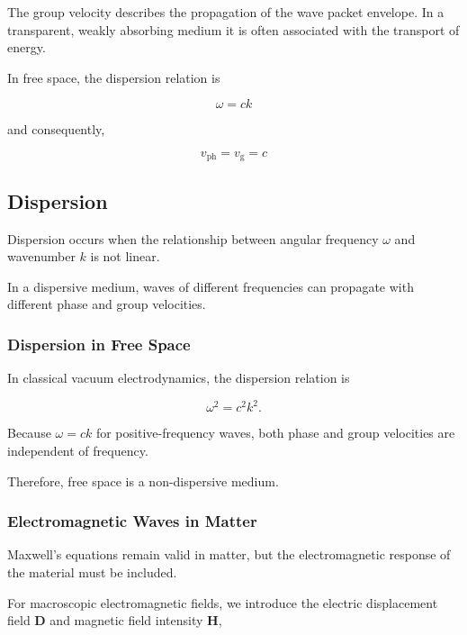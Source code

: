 The group velocity describes the propagation
of the wave packet envelope. In a transparent,
weakly absorbing medium it is often associated
with the transport of energy.


In free space, the dispersion relation is

\begin{equation}
\boxed{\omega = ck}
\label{eq:vacuum_dispersion_relation}
\end{equation}

and consequently,

\begin{equation}
\boxed{
v_{\mathrm{ph}} = v_{\mathrm{g}} = c
}
\label{eq:vacuum_velocities}
\end{equation}


\subsection{Dispersion}

Dispersion occurs when the relationship
between angular frequency $\omega$ and
wavenumber $k$ is not linear.

In a dispersive medium, waves of different
frequencies can propagate with different
phase and group velocities.

\subsubsection{Dispersion in Free Space}

In classical vacuum electrodynamics,
the dispersion relation is

\begin{equation}
\omega^2 = c^2 k^2.
\end{equation}

Because $\omega=ck$ for positive-frequency
waves, both phase and group velocities are
independent of frequency.

Therefore, free space is a non-dispersive
medium.


\subsubsection{Electromagnetic Waves in Matter}

Maxwell's equations remain valid in matter,
but the electromagnetic response of the
material must be included.

For macroscopic electromagnetic fields,
we introduce the electric displacement
field $\mathbf{D}$ and magnetic field
intensity $\mathbf{H}$,

